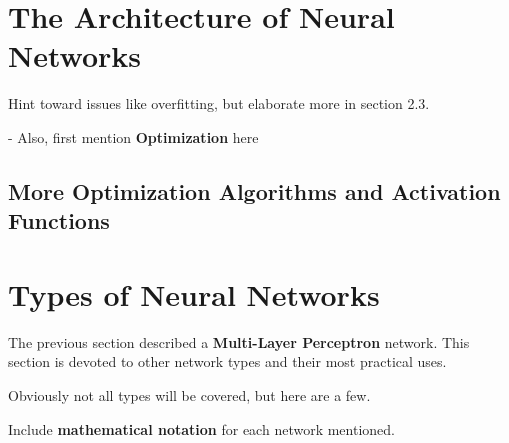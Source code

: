 \section{The Architecture of Neural Networks} %

Hint toward issues like overfitting, but elaborate more in section 2.3.

- Also, first mention \textbf{Optimization} here






\subsection{More Optimization Algorithms and Activation Functions}

\section{Types of Neural Networks} %
The previous section described a \textbf{Multi-Layer Perceptron} network.  This section is devoted to other network types and their most practical uses.


Obviously not all types will be covered, but here are a few.  

Include \textbf{mathematical notation} for each network mentioned.


